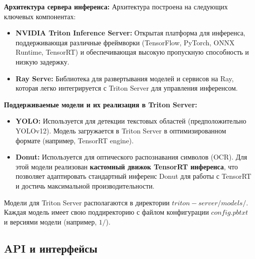 \documentclass[12pt, a4paper]{article}
\theoremstyle{definition}
\theoremstyle{remark}
\begin{document}
	\textbf{Архитектура сервера инференса:}
	Архитектура построена на следующих ключевых компонентах:
	\begin{itemize}
		\item \textbf{NVIDIA Triton Inference Server:} Открытая платформа для инференса, поддерживающая различные фреймворки (TensorFlow, PyTorch, ONNX Runtime, TensorRT) и обеспечивающая высокую пропускную способность и низкую задержку.
		\item \textbf{Ray Serve:} Библиотека для развертывания моделей и сервисов на Ray, которая легко интегрируется с Triton Server для управления инференсом.
	\end{itemize}
	
	\textbf{Поддерживаемые модели и их реализация в Triton Server:}
	\begin{itemize}
		\item \textbf{YOLO:} Используется для детекции текстовых областей (предположительно YOLOv12). Модель загружается в Triton Server в оптимизированном формате (например, TensorRT engine).
		\item \textbf{Donut:} Используется для оптического распознавания символов (OCR). Для этой модели реализован \textbf{кастомный движок TensorRT инференса}, что позволяет адаптировать стандартный инференс Donut для работы с TensorRT и достичь максимальной производительности.
	\end{itemize}
	Модели для Triton Server располагаются в директории $triton-server/models/$. Каждая модель имеет свою поддиректорию с файлом конфигурации $config.pbtxt$ и версиями модели (например, $1/$).
	
	\subsection{API и интерфейсы}
\end{document}
